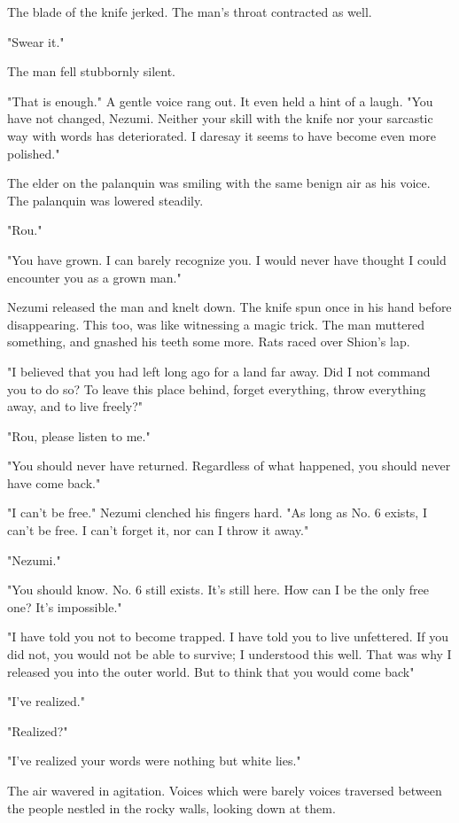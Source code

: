 The blade of the knife jerked. The man's throat contracted as well.

"Swear it."

The man fell stubbornly silent.

"That is enough." A gentle voice rang out. It even held a hint of a
laugh. "You have not changed, Nezumi. Neither your skill with the knife
nor your sarcastic way with words has deteriorated. I daresay it seems
to have become even more polished."

The elder on the palanquin was smiling with the same benign air as his
voice. The palanquin was lowered steadily.

"Rou."

"You have grown. I can barely recognize you. I would never have thought
I could encounter you as a grown man."

Nezumi released the man and knelt down. The knife spun once in his hand
before disappearing. This too, was like witnessing a magic trick. The
man muttered something, and gnashed his teeth some more. Rats raced over
Shion's lap.

"I believed that you had left long ago for a land far away. Did I not
command you to do so? To leave this place behind, forget everything,
throw everything away, and to live freely?"

"Rou, please listen to me."

"You should never have returned. Regardless of what happened, you should
never have come back."

"I can't be free." Nezumi clenched his fingers hard. "As long as No. 6
exists, I can't be free. I can't forget it, nor can I throw it away."

"Nezumi."

"You should know. No. 6 still exists. It's still here. How can I be the
only free one? It's impossible."

"I have told you not to become trapped. I have told you to live
unfettered. If you did not, you would not be able to survive; I
understood this well. That was why I released you into the outer world.
But to think that you would come back\el "

"I've realized."

"Realized?"

"I've realized your words were nothing but white lies."

The air wavered in agitation. Voices which were barely voices traversed
between the people nestled in the rocky walls, looking down at them.

